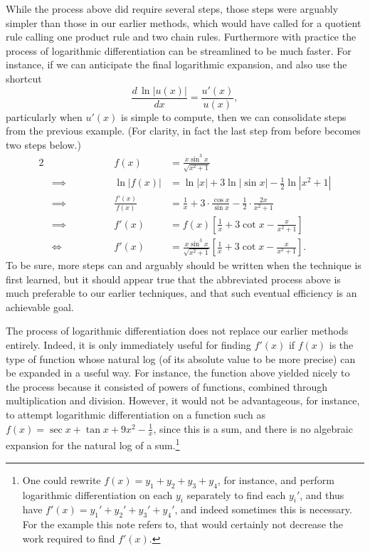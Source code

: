 While the process above did require several steps, those steps
were arguably simpler than those in our earlier methods,
which would have called for  a quotient rule calling 
one product rule and two chain rules.  Furthermore 
with practice the process of logarithmic differentiation 
can be streamlined to be much faster.  For instance, if we
can anticipate the final logarithmic expansion, and also use 
the shortcut
\begin{equation}
\frac{d\,\ln|u(x)|}{dx}=\frac{u'(x)}{u(x)},\label{ShortcutForLogDiff}
\end{equation}
particularly when  $u'(x)$ is simple to compute,
then we can consolidate steps from the previous example.
(For clarity, in fact the last step from before becomes
two steps below.)
\begin{alignat*}{2}
&&f(x)&=\frac{x\sin^3 x}{\sqrt{x^2+1}}\\
&\implies\qquad\qquad&\ln|f(x)|&=\ln|x|+3\ln|\sin x|-\frac12\ln|x^2+1|\\
&\implies&\frac{f'(x)}{f(x)}&=\frac1x+3\cdot\frac{\cos x}{\sin x}
                              -\frac12\cdot\frac{2x}{x^2+1}\\
&\implies&f'(x)&=f(x)\left[\frac1x+3\cot x-\frac{x}{x^2+1}\right]\\
&\iff          &f'(x)&=\frac{x\sin^3 x}{\sqrt{x^2+1}}\left[
                           \frac1x+3\cot x-\frac{x}{x^2+1}\right].
\end{alignat*}
To be sure, more steps can and arguably should be written when the
technique is first learned, but it should appear true that
the abbreviated process above is much preferable to our earlier
techniques, and that such eventual efficiency is an achievable 
goal.

The process of logarithmic differentiation does not
replace our earlier methods entirely.  Indeed, it is
only immediately useful for finding $f'(x)$ if $f(x)$
is the type of function whose natural log (of its 
absolute value to be more precise) can
be expanded in a useful way.  For instance, 
the function above yielded nicely to the process because
it consisted of powers of functions, combined through multiplication
and division.  However, it would not be advantageous, for instance,
to attempt logarithmic differentiation on a function such as
$f(x)=\sec x+\tan x+9x^2-\frac1x$, since this is a sum,
and there is no algebraic expansion for the natural log of a 
sum.\footnote{%
One could rewrite $f(x)=y_1+y_2+y_3+y_4$, for instance, and perform
logarithmic differentiation on each $y_i$ separately to find each
$y_i'$, and thus have $f'(x)=y_1'+y_2'+y_3'+y_4'$, and 
indeed sometimes this is necessary.  For the example
this note refers to, that would certainly not decrease the
work required to find $f'(x)$.}
\hphantom{. }

